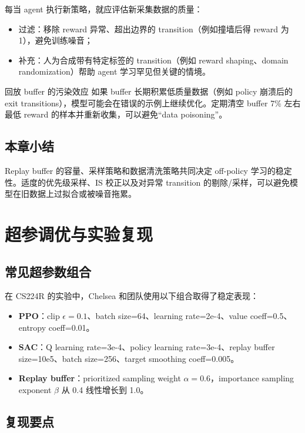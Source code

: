 \documentclass[a4paper]{article}
\begin{document}
每当 agent 执行新策略，就应评估新采集数据的质量：

\begin{itemize}
    \item 过滤：移除 reward 异常、超出边界的 transition（例如撞墙后得 reward 为 1），避免训练噪音；
    \item 补充：人为合成带有特定标签的 transition（例如 reward shaping、domain randomization）帮助 agent 学习罕见但关键的情境。
\end{itemize}

\begin{warningbox}{回放 buffer 的污染效应}
如果 buffer 长期积累低质量数据（例如 policy 崩溃后的 exit transitions），模型可能会在错误的示例上继续优化。定期清空 buffer 7\% 左右最低 reward 的样本并重新收集，可以避免“data poisoning”。
\end{warningbox}

\subsection{本章小结}

Replay buffer 的容量、采样策略和数据清洗策略共同决定 off-policy 学习的稳定性。适度的优先级采样、IS 校正以及对异常 transition 的剔除/采样，可以避免模型在旧数据上过拟合或被噪音拖累。

\section{超参调优与实验复现}

\subsection{常见超参数组合}

在 CS224R 的实验中，Chelsea 和团队使用以下组合取得了稳定表现：

\begin{itemize}
    \item \textbf{PPO}：clip $\epsilon=0.1$、batch size=64、learning rate=2e-4、value coeff=0.5、entropy coeff=0.01。
    \item \textbf{SAC}：Q learning rate=3e-4、policy learning rate=3e-4、replay buffer size=10e5、batch size=256、target smoothing coeff=0.005。
    \item \textbf{Replay buffer}：prioritized sampling weight $\alpha=0.6$，importance sampling exponent $\beta$ 从 0.4 线性增长到 1.0。
\end{itemize}

\subsection{复现要点}
\end{document}
